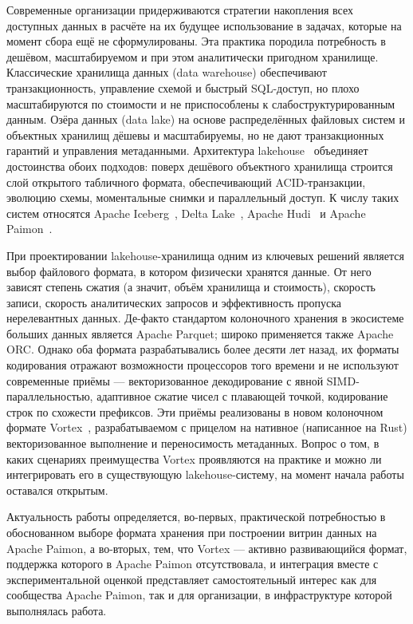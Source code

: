 \introduction %

Современные организации придерживаются стратегии накопления всех доступных данных в
расчёте на их будущее использование в задачах, которые на момент сбора ещё не
сформулированы. Эта практика породила потребность в дешёвом, масштабируемом и при
этом аналитически пригодном хранилище. Классические хранилища данных (data
warehouse) обеспечивают транзакционность, управление схемой и быстрый SQL-доступ, но
плохо масштабируются по стоимости и не приспособлены к слабоструктурированным
данным. Озёра данных (data lake) на основе распределённых файловых систем и
объектных хранилищ дёшевы и масштабируемы, но не дают транзакционных гарантий и
управления метаданными. Архитектура lakehouse~\cite{armbrust2021lakehouse}
объединяет достоинства обоих подходов: поверх дешёвого объектного хранилища строится
слой открытого табличного формата, обеспечивающий ACID-транзакции, эволюцию схемы,
моментальные снимки и параллельный доступ. К числу таких систем относятся Apache
Iceberg~\cite{iceberg-spec}, Delta Lake~\cite{armbrust2020delta}, Apache
Hudi~\cite{hudi-docs} и Apache Paimon~\cite{paimon-docs}.

При проектировании lakehouse-хранилища одним из ключевых решений является выбор
файлового формата, в котором физически хранятся данные. От него зависят степень
сжатия (а значит, объём хранилища и стоимость), скорость записи, скорость
аналитических запросов и эффективность пропуска нерелевантных данных. Де-факто
стандартом колоночного хранения в экосистеме больших данных является Apache Parquet;
широко применяется также Apache ORC. Однако оба формата разрабатывались более
десяти лет назад, их форматы кодирования отражают возможности процессоров того
времени и не используют современные приёмы --- векторизованное декодирование с
явной SIMD-параллельностью, адаптивное сжатие чисел с плавающей точкой, кодирование
строк по схожести префиксов. Эти приёмы реализованы в новом колоночном формате
Vortex~\cite{vortex-repo, vortex-docs}, разрабатываемом с прицелом на нативное
(написанное на Rust) векторизованное выполнение и переносимость метаданных. Вопрос
о том, в каких сценариях преимущества
Vortex проявляются на практике и можно ли интегрировать его в существующую
lakehouse-систему, на момент начала работы оставался открытым.

Актуальность работы определяется, во-первых, практической потребностью в
обоснованном выборе формата хранения при построении витрин данных на Apache Paimon,
а во-вторых, тем, что Vortex --- активно развивающийся формат, поддержка которого в
Apache Paimon отсутствовала, и интеграция вместе с экспериментальной оценкой
представляет самостоятельный интерес как для сообщества Apache Paimon, так и для
организации, в инфраструктуре которой выполнялась работа.

